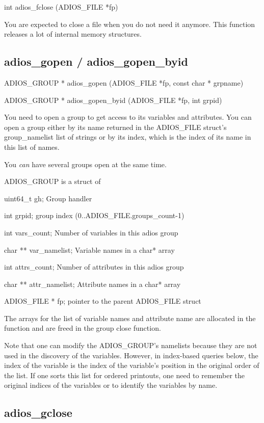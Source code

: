 int adios\_fclose (ADIOS\_FILE *fp)

You are expected to close a file when you do not need it anymore. This function 
releases a lot of internal memory structures.\label{HToc182553403}

\subsection{adios\_gopen / adios\_gopen\_byid}

ADIOS\_GROUP * adios\_gopen (ADIOS\_FILE *fp, const char * grpname)

ADIOS\_GROUP * adios\_gopen\_byid (ADIOS\_FILE *fp, int grpid)

You need to open a group to get access to its variables and attributes. You can 
open a group either by its name returned in the ADIOS\_FILE struct's group\_namelist 
list of strings or by its index, which is the index of its name in this list of 
names. 

You \textit{can} have several groups open at the same time.

ADIOS\_GROUP is a struct of

\leftskip=22pt
uint64\_t gh;   Group handler

int grpid;   group index (0..ADIOS\_FILE.groups\_count-1)

int vars\_count;   Number of variables in this adios group

char   **  var\_namelist;  Variable names in a char* array 

int attrs\_count;  Number of attributes in this adios group 

char   ** attr\_namelist; Attribute names in a char* array 

ADIOS\_FILE * fp;   pointer to the parent ADIOS\_FILE struct  

\leftskip=0pt
The arrays for the list of variable names and attribute name are allocated in the 
function and are freed in the group close function.

Note that one can modify the ADIOS\_GROUP's namelists because they are not used 
in the discovery of the variables. However, in index-based queries below, the index 
of the variable is the index of the variable's position in the original order of 
the list. If one sorts this list for ordered printouts, one need to remember the 
original indices of the variables or to identify the variables by name. \label{HToc182553404}

\subsection{adios\_gclose}

